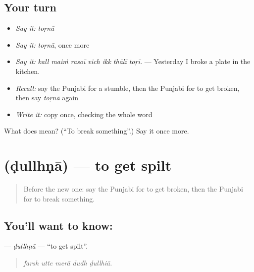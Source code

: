 \subsection*{Your turn}
\begin{itemize}
\raggedright
  \item \emph{Say it:} \emph{toṛnā}
  \item \emph{Say it:} \emph{toṛnā}, once more
  \item \emph{Say it:} \emph{kall maiṁ rasoī vich ikk thālī toṛī.} — Yesterday I broke a plate in the kitchen.
  \item \emph{Recall:} say the Punjabi for a stumble, then the Punjabi for to get broken, then say \emph{toṛnā} again
  \item \emph{Write it:} copy \textbf{} once, checking the whole word
\end{itemize}

\begin{tcolorbox}[breakable,colback=teal!4,colframe=teal!35!black,title={Before you move on}]
What does  mean? (\textquotedblleft{}To break something\textquotedblright{}.) Say it once more.
\end{tcolorbox}
\section[\texorpdfstring{\pa{ਡੁੱਲ੍ਹਣਾ} (ḍullhṇā)}{ਡੁੱਲ੍ਹਣਾ (ḍullhṇā)}]{ (ḍullhṇā) — to get spilt}

\label{lesson:PA-C310-dullhna}



\begin{quote}
Before the new one: say the Punjabi for to get broken, then the Punjabi for to break something.
\end{quote}

\subsection*{You'll want to know: }
\textbf{} — \emph{ḍullhṇā} — \textquotedblleft{}to get spilt\textquotedblright{}.

\begin{quote}
    
\end{quote}

\begin{quote}
\emph{farsh utte merā dudh ḍullhiā.}
\end{quote}

